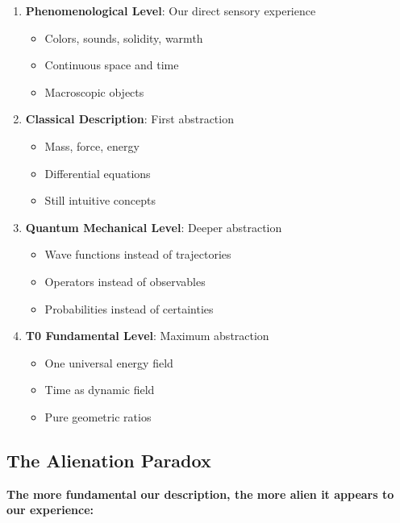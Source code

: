 \documentclass[12pt,a4paper]{article}
\begin{document}
	\begin{tcolorbox}[colback=orange!5!white,colframe=orange!75!black,title=Ontological Layering of Reality]
		\begin{enumerate}
			\item \textbf{Phenomenological Level}: Our direct sensory experience
			\begin{itemize}
				\item Colors, sounds, solidity, warmth
				\item Continuous space and time
				\item Macroscopic objects
			\end{itemize}
			
			\item \textbf{Classical Description}: First abstraction
			\begin{itemize}
				\item Mass, force, energy
				\item Differential equations
				\item Still intuitive concepts
			\end{itemize}
			
			\item \textbf{Quantum Mechanical Level}: Deeper abstraction
			\begin{itemize}
				\item Wave functions instead of trajectories
				\item Operators instead of observables
				\item Probabilities instead of certainties
			\end{itemize}
			
			\item \textbf{T0 Fundamental Level}: Maximum abstraction
			\begin{itemize}
				\item One universal energy field
				\item Time as dynamic field
				\item Pure geometric ratios
			\end{itemize}
		\end{enumerate}
	\end{tcolorbox}
	
	\subsection{The Alienation Paradox}
	
	\textbf{The more fundamental our description, the more alien it appears to our experience:}
	
\end{document}
